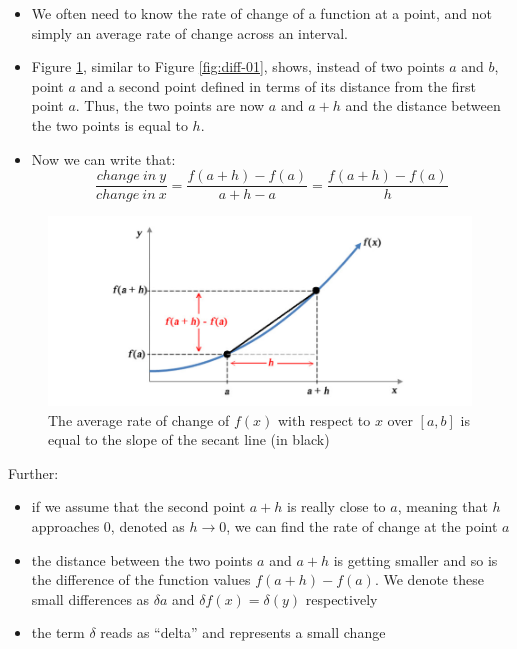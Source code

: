 \documentclass[
]{book}
\providecommand{\tightlist}{%
  \setlength{\itemsep}{0pt}\setlength{\parskip}{0pt}}
\theoremstyle{definition}
\theoremstyle{definition}
\theoremstyle{definition}
\theoremstyle{remark}
\begin{document}
\begin{itemize}
\tightlist
\item
  We often need to know the rate of change of a function at a point, and not simply an average rate of change across an interval.
\item
  Figure \ref{fig:diff-02}, similar to Figure \ref{fig:diff-01}, shows, instead of two points \(a\) and \(b\), point \(a\) and a second point defined in terms of its distance from the first point \(a\). Thus, the two points are now \(a\) and \(a + h\) and the distance between the two points is equal to \(h\).
\item
  Now we can write that:
  \[\frac{change\:in\:y}{change\:in\:x}=\frac{f(a+h)-f(a)}{a+h-a} = \frac{f(a+h)-f(a)}{h}\]
\end{itemize}

\begin{figure}

{\centering \includegraphics{figures/precourse/math-differentiation-02} 

}

\caption{The average rate of change of $f(x)$ with respect to $x$ over $[a, b]$ is equal to the slope of the secant line (in black)}\label{fig:diff-02}
\end{figure}

Further:

\begin{itemize}
\tightlist
\item
  if we assume that the second point \(a+h\) is really close to \(a\), meaning that \(h\) approaches 0, denoted as \(h \rightarrow 0\), we can find the rate of change at the point \(a\)
\item
  the distance between the two points \(a\) and \(a+h\) is getting smaller and so is the difference of the function values \(f(a+h) - f(a)\). We denote these small differences as \(\delta a\) and \(\delta f(x) = \delta(y)\) respectively
\item
  the term \(\delta\) reads as ``delta'' and represents a small change
\end{itemize}
\end{document}
